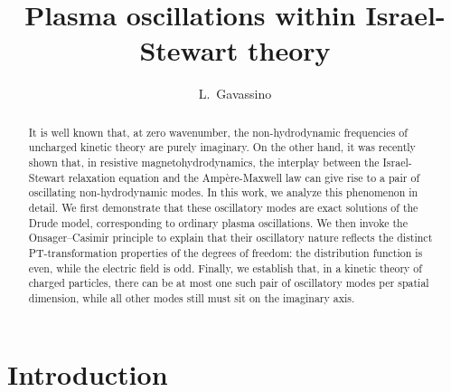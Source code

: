 \documentclass[a4paper, amsfonts, amssymb, amsmath, reprint, showkeys, nofootinbib, twoside,notitlepage,onecolumn]{revtex4-1}
\theoremstyle{definition}
\theoremstyle{theorem}
\begin{document}
\title{Plasma oscillations within Israel-Stewart theory}
\author{L.~Gavassino}

\begin{abstract}
It is well known that, at zero wavenumber, the non-hydrodynamic frequencies of uncharged kinetic theory are purely imaginary. On the other hand, it was recently shown that, in resistive magnetohydrodynamics, the interplay between the Israel-Stewart relaxation equation and the Amp\`{e}re-Maxwell law can give rise to a pair of oscillating non-hydrodynamic modes. In this work, we analyze this phenomenon in detail. We first demonstrate that these oscillatory modes are exact solutions of the Drude model, corresponding to ordinary plasma oscillations. We then invoke the Onsager–Casimir principle to explain that their oscillatory nature reflects the distinct PT-transformation properties of the degrees of freedom: the distribution function is even, while the electric field is odd. Finally, we establish that, in a kinetic theory of charged particles, there can be at most one such pair of oscillatory modes per spatial dimension, while all other modes still must sit on the imaginary axis.
\end{abstract} 
\maketitle

\section{Introduction}
\vspace{-0.3cm}
\end{document}

